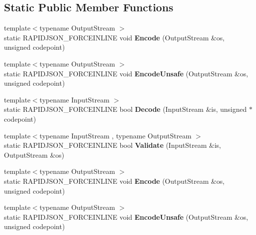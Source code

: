 \subsection*{Static Public Member Functions}
\begin{DoxyCompactItemize}
\item 
{\footnotesize template$<$typename Output\+Stream $>$ }\\static R\+A\+P\+I\+D\+J\+S\+O\+N\+\_\+\+F\+O\+R\+C\+E\+I\+N\+L\+I\+NE void {\bfseries Encode} (Output\+Stream \&os, unsigned codepoint)\hypertarget{struct_auto_u_t_f_a414946115261f886e74dd42cb4b98781}{}\label{struct_auto_u_t_f_a414946115261f886e74dd42cb4b98781}

\item 
{\footnotesize template$<$typename Output\+Stream $>$ }\\static R\+A\+P\+I\+D\+J\+S\+O\+N\+\_\+\+F\+O\+R\+C\+E\+I\+N\+L\+I\+NE void {\bfseries Encode\+Unsafe} (Output\+Stream \&os, unsigned codepoint)\hypertarget{struct_auto_u_t_f_a05f5dcd1f153b61b763e44ed452de251}{}\label{struct_auto_u_t_f_a05f5dcd1f153b61b763e44ed452de251}

\item 
{\footnotesize template$<$typename Input\+Stream $>$ }\\static R\+A\+P\+I\+D\+J\+S\+O\+N\+\_\+\+F\+O\+R\+C\+E\+I\+N\+L\+I\+NE bool {\bfseries Decode} (Input\+Stream \&is, unsigned $\ast$codepoint)\hypertarget{struct_auto_u_t_f_aa5e3c1dc23dbb75f6442ff69500a35b0}{}\label{struct_auto_u_t_f_aa5e3c1dc23dbb75f6442ff69500a35b0}

\item 
{\footnotesize template$<$typename Input\+Stream , typename Output\+Stream $>$ }\\static R\+A\+P\+I\+D\+J\+S\+O\+N\+\_\+\+F\+O\+R\+C\+E\+I\+N\+L\+I\+NE bool {\bfseries Validate} (Input\+Stream \&is, Output\+Stream \&os)\hypertarget{struct_auto_u_t_f_a36dd6f226d6a07c12161e21c0aff20b1}{}\label{struct_auto_u_t_f_a36dd6f226d6a07c12161e21c0aff20b1}

\item 
{\footnotesize template$<$typename Output\+Stream $>$ }\\static R\+A\+P\+I\+D\+J\+S\+O\+N\+\_\+\+F\+O\+R\+C\+E\+I\+N\+L\+I\+NE void {\bfseries Encode} (Output\+Stream \&os, unsigned codepoint)\hypertarget{struct_auto_u_t_f_a414946115261f886e74dd42cb4b98781}{}\label{struct_auto_u_t_f_a414946115261f886e74dd42cb4b98781}

\item 
{\footnotesize template$<$typename Output\+Stream $>$ }\\static R\+A\+P\+I\+D\+J\+S\+O\+N\+\_\+\+F\+O\+R\+C\+E\+I\+N\+L\+I\+NE void {\bfseries Encode\+Unsafe} (Output\+Stream \&os, unsigned codepoint)\hypertarget{struct_auto_u_t_f_a05f5dcd1f153b61b763e44ed452de251}{}\label{struct_auto_u_t_f_a05f5dcd1f153b61b763e44ed452de251}


\end{DoxyCompactItemize}
